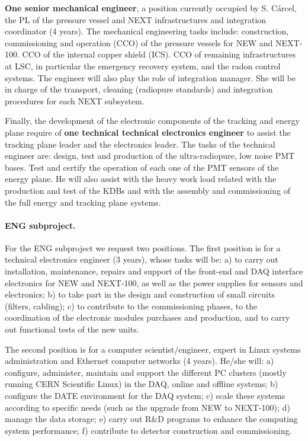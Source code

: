 {\bf One senior mechanical engineer}, a position currently occupied by S. Cárcel, the PL of the pressure vessel and NEXT infrastructures and integration coordinator (4 years). 
The mechanical engineering tasks include: construction, commissioning and operation (CCO) of the pressure vessels for NEW and NEXT-100. CCO of the internal copper shield (ICS). CCO of remaining infrastructures at LSC, in particular the emergency recovery system, and the radon control systems. The engineer will also play the role of integration manager. She will be in charge of the transport, cleaning (radiopure standards) and integration procedures for each NEXT subsystem.

Finally, the development of the electronic components of the tracking and energy plane require of {\bf one technical technical electronics engineer} to assist the tracking plane leader and the electronics leader. The tasks of the technical engineer are: design, test and production of the ultra-radiopure, low noise PMT bases. Test and certify the operation of each one of the PMT sensors of the energy plane. He will also assist with the heavy work load related with the production and test of the KDBs and with the assembly and commissioning of the full energy and tracking plane systems.
\paragraph{ENG subproject.}

For the ENG subproject we request two positions. The first position is for a technical electronics engineer (3 years), whose tasks will be: a) to carry out installation, maintenance, repairs and support of the front-end and DAQ interface electronics for NEW and NEXT-100, as well as the power supplies for sensors and electronics; b) to take part in the design and construction of small circuits (filters, cabling); c) to contribute to the commissioning phases, to the coordination of the electronic modules purchases and production, and to carry out functional tests of the new units. 

The second position is for a computer scientist/engineer, expert in Linux systems administration and Ethernet computer networks (4 years). He/she will: a) configure, administer, maintain and support the different PC clusters (mostly running CERN Scientific Linux) in the DAQ, online and offline systems; b) configure the DATE environment for the DAQ system; c) scale these systems according to specific needs (such as the upgrade from NEW to NEXT-100); d) manage the data storage; e) carry out R\&D programs to enhance the computing system performance; f) contribute to detector construction and commissioning. 

